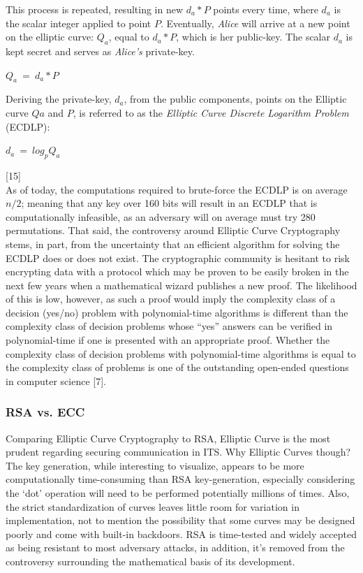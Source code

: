 \documentclass[conference,compsoc]{IEEEtran}
\begin{document}
This process is repeated, resulting in new $d_a*P$ points every time, where $d_a$ is the scalar integer applied to point $P$. Eventually, \emph{Alice} will arrive at a new point on the elliptic curve: $Q_a$, equal to $d_a*P$, which is her public-key. The scalar $d_a$ is kept secret and serves as \emph{Alice’s} private-key.\\

\begin{center}
\large $Q_a~ =~ d_a*P$
\break
\end{center}

Deriving the private-key, $d_a$, from the public components, points on the Elliptic curve $Qa$ and $P$, is referred to as the \emph{Elliptic Curve Discrete Logarithm Problem} (ECDLP):\\

\begin{center}
\large $d_a~ =~ log_pQ_a$
\end{center}

\hfill[15]\\

As of today, the computations required to brute-force the ECDLP is on average $n/2$; meaning that any key over 160 bits will result in an ECDLP that is computationally infeasible, as an adversary will on average must try 280 permutations. That said, the controversy around Elliptic Curve Cryptography stems, in part, from the uncertainty that an efficient algorithm for solving the ECDLP does or does not exist. The cryptographic community is hesitant to risk encrypting data with a protocol which may be proven to be easily broken in the next few years when a mathematical wizard publishes a new proof. The likelihood of this is low, however, as such a proof would imply the complexity class of a decision (yes/no) problem with polynomial-time algorithms is different than the complexity class of decision problems whose “yes” answers can be verified in polynomial-time if one is presented with an appropriate proof. Whether the complexity class of decision problems with polynomial-time algorithms is equal to the complexity class of problems is one of the outstanding open-ended questions in computer science [7].

\subsubsection{RSA vs. ECC}
Comparing Elliptic Curve Cryptography to RSA, Elliptic Curve is the most prudent regarding securing communication in ITS. Why Elliptic Curves though? The key generation, while interesting to visualize, appears to be more computationally time-consuming than RSA key-generation, especially considering the ‘dot’ operation will need to be performed potentially millions of times. Also, the strict standardization of curves leaves little room for variation in implementation, not to mention the possibility that some curves may be designed poorly and come with built-in backdoors. RSA is time-tested and widely accepted as being resistant to most adversary attacks, in addition, it’s removed from the controversy surrounding the mathematical basis of its development.
\end{document}
